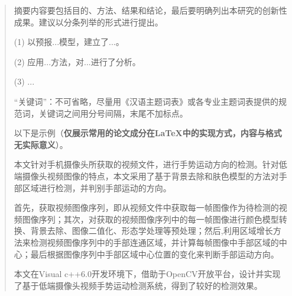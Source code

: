 

\begin{abstract}

摘要内容要包括目的、方法、结果和结论，最后要明确列出本研究的创新性成果。建议以分条列举的形式进行提出。

(1) 以预报...模型，建立了...。

(2) 应用...方法，对...进行了分析。

(3) ...

“关键词”：不可省略，尽量用《汉语主题词表》或各专业主题词表提供的规范词，关键词之间用分号间隔，末尾不加标点。

以下是示例（{\bf 仅展示常用的论文成分在LaTeX中的实现方式，内容与格式无实际意义}）。

本文针对手机摄像头所获取的视频文件，进行手势运动方向的检测。针对低端摄像头视频图像的特点，本文采用了基于背景去除和肤色模型的方法对手部区域进行检测，并判别手部运动的方向。

首先，获取视频图像序列，即从视频文件中获取每一帧图像作为待检测的视频图像序列；其次，对获取的视频图像序列中的每一帧图像进行颜色模型转换、背景去除、图像二值化、形态学处理等预处理；然后,利用区域增长方法来检测视频图像序列中的手部连通区域，并计算每帧图像中手部区域的中心；最后根据图像序列中手部区域中心位置的变化来判断手部运动方向。

本文在Visual c++6.0开发环境下，借助于OpenCV开放平台，设计并实现了基于低端摄像头视频手势运动检测系统，得到了较好的检测效果。


\end{abstract}
